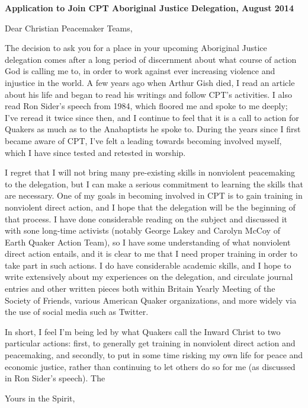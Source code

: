 \documentclass[a4paper,12pt]{letter}
\begin{document}
\begin{letter}{\textbf{Application to Join CPT Aboriginal Justice Delegation, August 2014}}

\opening{Dear Christian Peacemaker Teams,} %

The decision to ask you for a place in your upcoming Aboriginal Justice delegation comes after a long period of discernment about what course of action God is calling me to, in order to work against ever increasing violence and injustice in the world. A few years ago when Arthur Gish died, I read an article about his life and began to read his writings and follow CPT's activities. I also read Ron Sider's speech from 1984, which floored me and spoke to me deeply; I've reread it twice since then, and I continue to feel that it is a call to action for Quakers as much as to the Anabaptists he spoke to. During the years since I first became aware of CPT, I've felt a leading towards becoming involved myself, which I have since tested and retested in worship.

I regret that I will not bring many pre-existing skills in nonviolent peacemaking to the delegation, but I can make a serious commitment to learning the skills that are necessary. One of my goals in becoming involved in CPT is to gain training in nonviolent direct action, and I hope that the delegation will be the beginning of that process. I have done considerable reading on the subject and discussed it with sone long-time activists (notably George Lakey and Carolyn McCoy of Earth Quaker Action Team), so I have some understanding of what nonviolent direct action entails, and it is clear to me that I need proper training in order to take part in such actions. I do have considerable academic skills, and I hope to write extensively about my experiences on the delegation, and circulate journal entries and other written pieces both within Britain Yearly Meeting of the Society of Friends, various American Quaker organizations, and more widely via the use of social media such as Twitter.

In short, I feel I'm being led by what Quakers call the Inward Christ to two particular actions: first, to generally get training in nonviolent direct action and peacemaking, and secondly, to put in some time risking my own life for peace and economic justice, rather than continuing to let others do so for me (as discussed in Ron Sider's speech). The 




\closing{Yours in the Spirit,} %


\end{letter}
\end{document}
